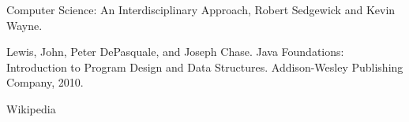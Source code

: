 
Computer Science: An Interdisciplinary Approach, Robert Sedgewick and Kevin Wayne.

Lewis, John, Peter DePasquale, and Joseph Chase. Java Foundations: Introduction to Program Design and Data Structures. Addison-Wesley Publishing Company, 2010.

Wikipedia

